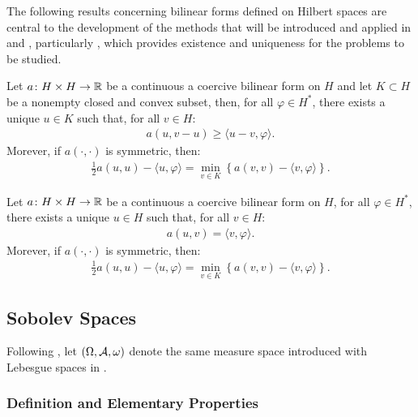 The following results concerning bilinear forms defined on Hilbert spaces are central to the development of the methods that will be introduced and applied in  and , particularly , which provides existence and uniqueness for the problems to be studied.

\begin{theorem}[Stampacchia]
    Let $a \colon H \times H \rightarrow \mathbb{R}$ be a continuous a coercive bilinear form on $H$ and let $K \subset H$ be a nonempty closed and convex subset, then, for all $\varphi \in H^*$, there exists a unique $u \in K$ such that, for all $v \in H$:
    \begin{align}
        a(u, v - u) \geq \langle u - v, \varphi \rangle.
    \end{align}
    Morever, if $a(\cdot, \cdot)$ is symmetric, then:
    \begin{align}
        \frac{1}{2} a(u, u) - \langle u, \varphi \rangle = \min_{v \in K} \left\{ a(v, v) - \langle v, \varphi \rangle \right\}.
    \end{align}
\end{theorem}

\begin{corollary} \label{theorem:lm}
    Let $a \colon H \times H \rightarrow \mathbb{R}$ be a continuous a coercive bilinear form on $H$, for all $\varphi \in H^*$, there exists a unique $u \in H$ such that, for all $v \in H$:
    \begin{align}
        a(u, v) = \langle v, \varphi \rangle.
    \end{align}
    Morever, if $a(\cdot, \cdot)$ is symmetric, then:
    \begin{align}
        \frac{1}{2} a(u, u) - \langle u, \varphi \rangle = \min_{v \in K} \left\{ a(v, v) - \langle v, \varphi \rangle \right\}.
    \end{align}
\end{corollary}

\newpage
\subsection{Sobolev Spaces} \label{subsection:sobolev}

Following \cite[p.~267]{Brezis2010}, let $(\Omega, \mathcal{A}, \omega)$ denote the same measure space introduced with Lebesgue spaces in .

\subsubsection{Definition and Elementary Properties}

